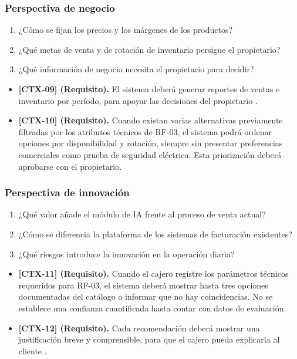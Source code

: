 \documentclass[onecolumn,12pt,a4paper]{IEEEtran}
\begin{document}
\subsubsection{Perspectiva de negocio}
\begin{enumerate}
  \item ¿C\'omo se fijan los precios y los m\'argenes de los productos?
  \item ¿Qu\'e metas de venta y de rotaci\'on de inventario persigue el propietario?
  \item ¿Qu\'e informaci\'on de negocio necesita el propietario para decidir?
\end{enumerate}
\begin{itemize}
  \item \textbf{[CTX-09] (Requisito).} El sistema deber\'a generar reportes de ventas e inventario por per\'iodo, para apoyar las decisiones del propietario \cite{iso25010}.
  \item \textbf{[CTX-10] (Requisito).} Cuando existan varias alternativas previamente filtradas por los atributos t\'ecnicos de RF-03, el sistema podr\'a ordenar opciones por disponibilidad y rotaci\'on, siempre sin presentar preferencias comerciales como prueba de seguridad el\'ectrica. Esta priorizaci\'on deber\'a aprobarse con el propietario.
\end{itemize}

\subsubsection{Perspectiva de innovaci\'on}
\begin{enumerate}
  \item ¿Qu\'e valor a\~nade el m\'odulo de IA frente al proceso de venta actual?
  \item ¿C\'omo se diferencia la plataforma de los sistemas de facturaci\'on existentes?
  \item ¿Qu\'e riesgos introduce la innovaci\'on en la operaci\'on diaria?
\end{enumerate}
\begin{itemize}
  \item \textbf{[CTX-11] (Requisito).} Cuando el cajero registre los par\'ametros t\'ecnicos requeridos para RF-03, el sistema deber\'a mostrar hasta tres opciones documentadas del cat\'alogo o informar que no hay coincidencias. No se establece una confianza cuantificada hasta contar con datos de evaluaci\'on.
  \item \textbf{[CTX-12] (Requisito).} Cada recomendaci\'on deber\'a mostrar una justificaci\'on breve y comprensible, para que el cajero pueda explicarla al cliente \cite{swebok4}.
\end{itemize}
\end{document}

